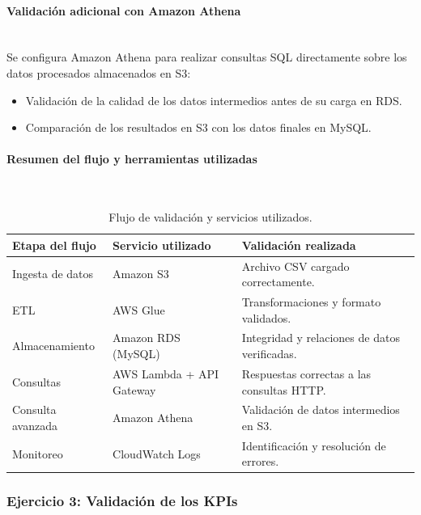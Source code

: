 \documentclass{article}
\begin{document}
\paragraph{Validación adicional con Amazon Athena} \mbox{} \\
Se configura Amazon Athena para realizar consultas SQL directamente sobre los datos procesados almacenados en S3:
\begin{itemize}
    \item Validación de la calidad de los datos intermedios antes de su carga en RDS.
    \item Comparación de los resultados en S3 con los datos finales en MySQL.
\end{itemize}

\paragraph{Resumen del flujo y herramientas utilizadas} \mbox{} \\
\begin{table}[h!]
    \centering
    \begin{tabular}{|l|l|p{8cm}|}
        \hline
        \textbf{Etapa del flujo} & \textbf{Servicio utilizado} & \textbf{Validación realizada} \\ \hline
        Ingesta de datos         & Amazon S3                  & Archivo CSV cargado correctamente. \\ \hline
        ETL                     & AWS Glue                   & Transformaciones y formato validados. \\ \hline
        Almacenamiento          & Amazon RDS (MySQL)         & Integridad y relaciones de datos verificadas. \\ \hline
        Consultas               & AWS Lambda + API Gateway   & Respuestas correctas a las consultas HTTP. \\ \hline
        Consulta avanzada       & Amazon Athena              & Validación de datos intermedios en S3. \\ \hline
        Monitoreo               & CloudWatch Logs            & Identificación y resolución de errores. \\ \hline
    \end{tabular}
    \caption{Flujo de validación y servicios utilizados.}
\end{table}


\subsubsection{Ejercicio 3: Validación de los KPIs}
\end{document}
